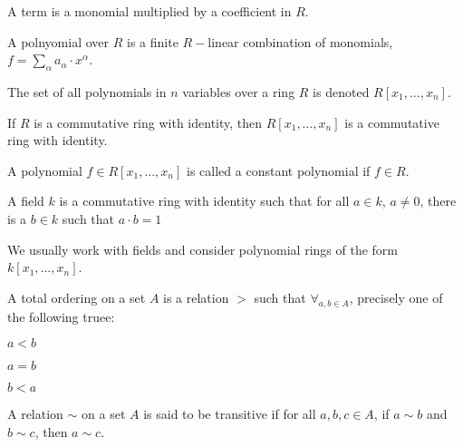             \begin{definition}
                A term is a monomial multiplied by a coefficient in $R$.
            \end{definition}
            \begin{definition}
                A polnyomial over $R$ is a finite $R-$linear
                combination of monomials,
                $f=\sum_{\alpha} a_{\alpha}\cdot x^{\alpha}$.
            \end{definition}
            The set of all polynomials in $n$ variables over a ring $R$ is
            denoted $R[x_1,\hdots, x_n]$.
            \begin{theorem}
                If $R$ is a commutative ring with identity,
                then $R[x_1,\hdots, x_n]$ is a commutative
                ring with identity.
            \end{theorem}
            \begin{definition}
                A polynomial $f\in R[x_1,\hdots, x_n]$ is
                called a constant polynomial if $f\in R$.
            \end{definition}
            \begin{definition}
                A field $k$ is a commutative ring with identity
                such that for all $a\in k$, $a\ne 0$, there is a
                $b\in k$ such that $a\cdot b=1$
            \end{definition}
            We usually work with fields and consider polynomial rings of the
            form $k[x_1,\hdots ,x_n]$.
            \begin{definition}
                A total ordering on a set $A$ is a relation
                $>$ such that $\forall_{a,b\in A}$, precisely one
                of the following truee:
                \begin{enumerate}
                    \begin{multicols}{3}
                        \item $a<b$
                        \item $a=b$
                        \item $b<a$
                    \end{multicols}
                \end{enumerate}
            \end{definition}
            \begin{definition}
                A relation $\sim$ on a set $A$ is said to be
                transitive if for all $a,b,c\in A$, if $a\sim b$ and
                $b\sim c$, then $a\sim c$.
            \end{definition}
